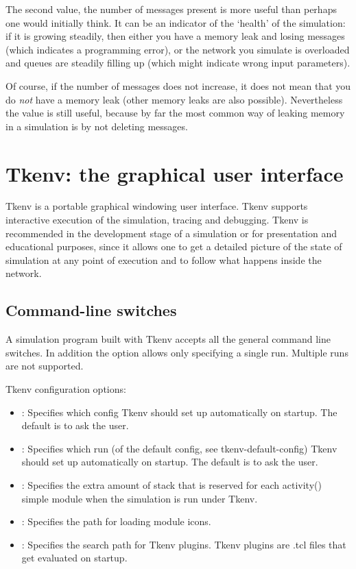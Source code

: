 The second value, the number of messages present is more useful than
perhaps one would initially think. It can be an indicator of the `health' of the simulation:
if it is growing steadily, then either you have a memory leak and losing
messages (which indicates a programming error), or the network you simulate is
overloaded and queues are steadily filling up (which might indicate wrong input
parameters).

Of course, if the number of messages does not increase, it does not mean
that you do \textit{not} have a memory leak (other memory leaks are also
possible). Nevertheless the value is still useful, because by far the
most common way of leaking memory in a simulation is by not deleting messages.



\section{Tkenv: the graphical user interface}

Tkenv is a portable graphical windowing user interface.
Tkenv supports interactive execution of the simulation, tracing and
debugging. Tkenv is recommended in the
development stage of a simulation or for presentation and educational
purposes, since it allows one to get a detailed picture of the state
of simulation at any point of execution and to follow what happens
inside the network.

\subsection{Command-line switches}

A simulation program built with Tkenv accepts all the general command line
switches. In addition the 
option allows only specifying a single run. Multiple runs are not supported.

Tkenv configuration options:
\begin{itemize}
  \item{:
    Specifies which config Tkenv should set up automatically on startup. The
    default is to ask the user.}                                             

  \item{: Specifies which run (of the default 
    config, see tkenv-default-config) Tkenv
    should set up automatically on startup. The default is to ask the user.}

  \item{:
    Specifies the extra amount of stack that is reserved for each activity()
    simple module when the simulation is run under Tkenv.}                   

  \item{: Specifies the path for loading module icons.}

  \item{:
    Specifies the search path for Tkenv plugins. Tkenv plugins are .tcl files
    that get evaluated on startup.}
\end{itemize}


